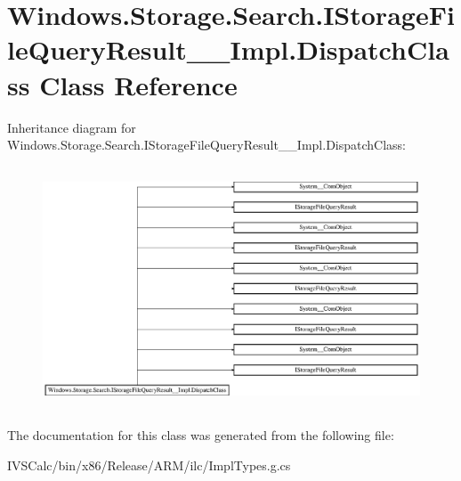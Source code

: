 \hypertarget{class_windows_1_1_storage_1_1_search_1_1_i_storage_file_query_result_____impl_1_1_dispatch_class}{}\section{Windows.\+Storage.\+Search.\+I\+Storage\+File\+Query\+Result\+\_\+\+\_\+\+Impl.\+Dispatch\+Class Class Reference}
\label{class_windows_1_1_storage_1_1_search_1_1_i_storage_file_query_result_____impl_1_1_dispatch_class}
Inheritance diagram for Windows.\+Storage.\+Search.\+I\+Storage\+File\+Query\+Result\+\_\+\+\_\+\+Impl.\+Dispatch\+Class\+:\begin{figure}[H]
\begin{center}
\leavevmode
\includegraphics[height=7.247059cm]{class_windows_1_1_storage_1_1_search_1_1_i_storage_file_query_result_____impl_1_1_dispatch_class}
\end{center}
\end{figure}


The documentation for this class was generated from the following file\+:\begin{DoxyCompactItemize}
\item 
I\+V\+S\+Calc/bin/x86/\+Release/\+A\+R\+M/ilc/Impl\+Types.\+g.\+cs\end{DoxyCompactItemize}
